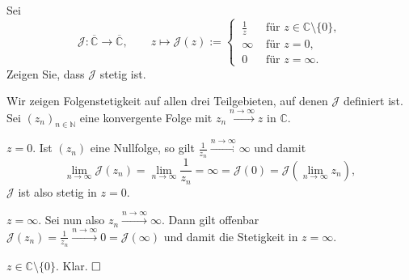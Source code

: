 \documentclass[11pt]{book}
\numberwithin{dummy}{section}
\theoremstyle{nonumberbreak}
\newenvironment{prob}[1][]{\ifthenelse{\equal{#1}{}}{\problem}{\problem[#1]}\rm}{\endproblem}
\newenvironment{sol}[1][]{\ifthenelse{\equal{#1}{}}{\solution}{\solution[#1]}\rm}{\endsolution}
\newcommand{\C}{\mathbb{C}}
\newcommand{\N}{\mathbb{N}}
\newcommand{\CC}{\overline{\mathbb{C}}}
\newcommand{\la}{\longrightarrow}
\begin{document}
\begin{spacing}{1.4}
\begin{prob}    %
Sei
$$\mathcal{J}: \CC \la \CC, \qquad z \mapsto \mathcal{J}(z):= \begin{cases} \ \frac{1}{z} & \textrm{ für } z \in \C \setminus \{0\}, \\ \ \infty & \textrm{ für } z=0, \\ \ 0 & \textrm{ für }z=\infty. \end{cases}$$
Zeigen Sie, dass $\mathcal{J}$ stetig ist.

\begin{sol}
Wir zeigen Folgenstetigkeit auf allen drei Teilgebieten, auf denen $\mathcal{J}$ definiert ist. Sei $(z_n)_{n \in \N}$ eine konvergente Folge mit $z_n \xrightarrow{n\to \infty} z$ in $\C$.
\begin{compactenum}
\item[$z=0.$] Ist $(z_n)$ eine Nullfolge, so gilt $\frac{1}{z_n} \xrightarrow{n\to \infty} \infty$ und damit
$$ \lim_{n \to \infty} \mathcal{J}(z_n) = \lim_{n\to \infty} \frac{1}{z_n} = \infty = \mathcal{J}(0) = \mathcal{J}\left( \lim_{n\to\infty} z_n\right),$$
$\mathcal{J}$ ist also stetig in $z=0$.
\item[$z=\infty$.] Sei nun also $z_n \xrightarrow{n \to \infty}\infty$. Dann gilt offenbar $\mathcal{J}(z_n) =\frac{1}{z_n} \xrightarrow{n \to \infty} 0 = \mathcal{J}(\infty)$ und damit die Stetigkeit in $z=\infty$.
\item[$z \in \C\setminus \{0\}$.] Klar. $\hfill \Box$
\end{compactenum}

\end{sol}

\end{prob}





\end{spacing}
\end{document}
